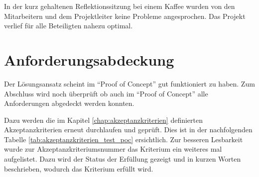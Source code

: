 In der kurz gehaltenen Reflektionssitzung bei einem Kaffee wurden von den Mitarbeitern
und dem Projektleiter keine Probleme angesprochen. Das Projekt verlief für 
alle Beteiligten nahezu optimal.

\section{Anforderungsabdeckung}
Der Lösungsansatz scheint im ``Proof of Concept'' gut funktioniert zu haben.
Zum Abschluss wird noch überprüft ob auch im ``Proof of Concept'' alle 
Anforderungen abgedeckt werden konnten.

Dazu werden die im Kapitel \ref{chap:akzeptanzkriterien} definierten 
Akzeptanzkriterien erneut durchlaufen und geprüft. Dies ist in der nachfolgenden Tabelle 
\ref{tab:akzeptanzkriterien_test_poc} ersichtlich. Zur besseren Lesbarkeit wurde zur 
Akzeptanzkriteriumsnummer das Kriterium ein weiteres mal aufgelistet. Dazu wird 
der Status der Erfüllung gezeigt und in kurzen Worten beschrieben, wodurch das
Kriterium erfüllt wird.


